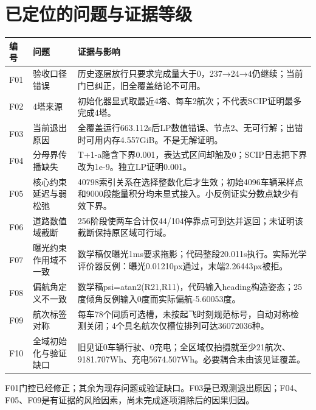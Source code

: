 \section*{已定位的问题与证据等级}
\begin{center}\small\begin{tabular}{p{13mm}p{35mm}p{109mm}}\toprule 编号 & 问题 & 证据与影响\\\midrule
F01 & 验收口径错误 & 历史逐层放行只要求完成量大于0，237→24→4仍继续；当前门已纠正，旧全覆盖结论不可用。\\
F02 & 4塔来源 & 初始化器显式取最近4塔、每车2航次；不代表SCIP证明最多完成4塔。\\
F03 & 当前退出原因 & 全覆盖运行663.112s后LP数值错误、节点2、无可行解；出错时可用内存4.557GiB。不是无解证明。\\
F04 & 分母界传播缺失 & T+1-a隐含下界0.001，表达式区间却触及0；SCIP日志把下界改为1e-9。独立LP证明0.001。\\
F05 & 核心约束延迟与弱松弛 & 40798索引关系在选择整数化后才生效；初始4096车辆采样点和9000段能量积分均未显式接入。小反例证实分数点缺少有效下界。\\
F06 & 道路数值域截断 & 256阶段使两车合计仅44/104停靠点可到达并返回；未证明该截断保持原区域可行域。\\
F07 & 曝光约束作用域不一致 & 数学稿仅曝光1ms要求拖影；代码整段20.011s执行。实际光学评价器反例：曝光0.01210px通过，末端2.26443px被拒。\\
F08 & 偏航角定义不一致 & 数学稿psi=atan2(R21,R11)，代码输入heading构造姿态；25度倾角反例输入0度而实际偏航-5.60053度。\\
F09 & 航次标签对称 & 每车78个同质可选槽，未按起飞时刻规范标号，自动对称检测关闭；4个具名航次仅槽位排列可达36072036种。\\
F10 & 全域初始化与验证缺口 & 旧见证0车辆行驶、0充电；全区域仅拍摄就至少21航次、9181.707Wh、充电5674.507Wh。必要耦合未由该见证覆盖。\\
\bottomrule\end{tabular}\end{center}\small F01门控已经修正；其余为现存问题或验证缺口。F03是已观测退出原因；F04、F05、F09是有证据的风险因素，尚未完成逐项消除后的因果归因。
\clearpage
